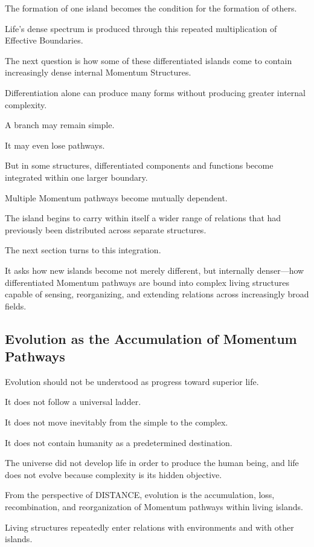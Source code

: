 The formation of one island becomes the condition for the formation of others.

Life’s dense spectrum is produced through this repeated multiplication of Effective Boundaries.

The next question is how some of these differentiated islands come to contain increasingly dense internal Momentum Structures.

Differentiation alone can produce many forms without producing greater internal complexity.

A branch may remain simple.

It may even lose pathways.

But in some structures, differentiated components and functions become integrated within one larger boundary.

Multiple Momentum pathways become mutually dependent.

The island begins to carry within itself a wider range of relations that had previously been distributed across separate structures.

The next section turns to this integration.

It asks how new islands become not merely different, but internally denser—how differentiated Momentum pathways are bound into complex living structures capable of sensing, reorganizing, and extending relations across increasingly broad fields.

\subsection*{\textbf{Evolution as the Accumulation of Momentum Pathways}}


Evolution should not be understood as progress toward superior life.

It does not follow a universal ladder.

It does not move inevitably from the simple to the complex.

It does not contain humanity as a predetermined destination.

The universe did not develop life in order to produce the human being, and life does not evolve because complexity is its hidden objective.

From the perspective of DISTANCE, evolution is the accumulation, loss, recombination, and reorganization of Momentum pathways within living islands.

Living structures repeatedly enter relations with environments and with other islands.

